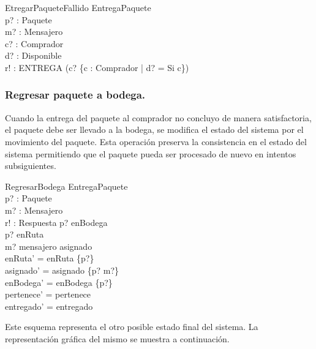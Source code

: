 \documentclass[12pt,a4paper]{article}
\begin{document}
\begin{schema}{EtregarPaqueteFallido}
\Xi EntregaPaquete\\
p? : Paquete\\
m? : Mensajero\\
c? : Comprador\\
d? : Disponible\\
r! : ENTREGA
\where
(c? \notin \{c : Comprador | d? = Si \spot c\})
\end{schema}


\subsubsection{Regresar paquete a bodega.}
Cuando la entrega del paquete al comprador no concluyo de manera satisfactoria, el paquete debe ser llevado a la bodega, se modifica el estado del sistema por el movimiento del paquete. Esta operación preserva la consistencia en el estado del sistema permitiendo que el paquete pueda ser procesado de nuevo en intentos subsiguientes.

\begin{schema}{RegresarBodega}
\Delta EntregaPaquete\\
p? : Paquete\\
m? : Mensajero\\
r! : Respuesta
\where
p? \notin enBodega\\
p? \in  enRuta\\
m? \in mensajero \setminus \ran asignado\\
enRuta' = enRuta \setminus \{p?\}\\
asignado' = asignado \setminus \{p? \mapsto m?\}\\
enBodega' = enBodega \cup \{p?\}\\
pertenece' = pertenece\\
entregado' = entregado
\end{schema}

Este esquema representa el otro posible estado final del sistema. La representación gráfica del mismo se muestra a continuación. 
\end{document}

